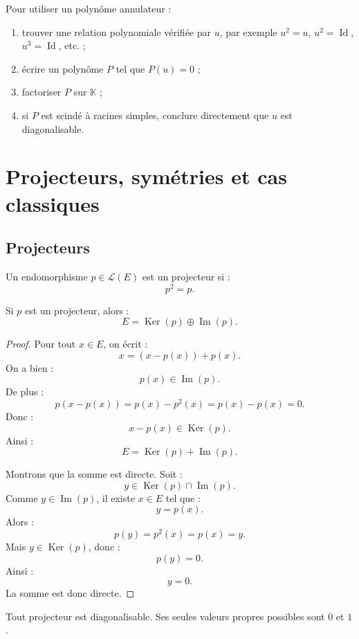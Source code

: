 \documentclass[11pt,a4paper]{article}
\newcommand{\K}{\mathbb K}
\newcommand{\Lcal}{\mathcal L}
\newcommand{\Ker}{\operatorname{Ker}}
\newcommand{\Imf}{\operatorname{Im}}
\newcommand{\Id}{\operatorname{Id}}
\begin{document}
\begin{methodbox}
Pour utiliser un polynôme annulateur :
\begin{enumerate}
    \item trouver une relation polynomiale vérifiée par \(u\), par exemple \(u^2=u\), \(u^2=\Id\), \(u^3=\Id\), etc. ;
    \item écrire un polynôme \(P\) tel que \(P(u)=0\) ;
    \item factoriser \(P\) sur \(\K\) ;
    \item si \(P\) est scindé à racines simples, conclure directement que \(u\) est diagonalisable.
\end{enumerate}
\end{methodbox}

\section{Projecteurs, symétries et cas classiques}

\subsection{Projecteurs}

\begin{definitionbox}[Projecteur]
Un endomorphisme \(p\in\Lcal(E)\) est un projecteur si :
\[
p^2=p.
\]
\end{definitionbox}

\begin{theorembox}
Si \(p\) est un projecteur, alors :
\[
E=\Ker(p)\oplus\Imf(p).
\]
\end{theorembox}

\begin{proof}
Pour tout \(x\in E\), on écrit :
\[
x=(x-p(x))+p(x).
\]
On a bien :
\[
p(x)\in\Imf(p).
\]
De plus :
\[
p(x-p(x))=p(x)-p^2(x)=p(x)-p(x)=0.
\]
Donc :
\[
x-p(x)\in\Ker(p).
\]
Ainsi :
\[
E=\Ker(p)+\Imf(p).
\]

Montrons que la somme est directe.  
Soit :
\[
y\in\Ker(p)\cap\Imf(p).
\]
Comme \(y\in\Imf(p)\), il existe \(x\in E\) tel que :
\[
y=p(x).
\]
Alors :
\[
p(y)=p^2(x)=p(x)=y.
\]
Mais \(y\in\Ker(p)\), donc :
\[
p(y)=0.
\]
Ainsi :
\[
y=0.
\]
La somme est donc directe.
\end{proof}

\begin{theorembox}
Tout projecteur est diagonalisable.  
Ses seules valeurs propres possibles sont \(0\) et \(1\).
\end{theorembox}
\end{document}
